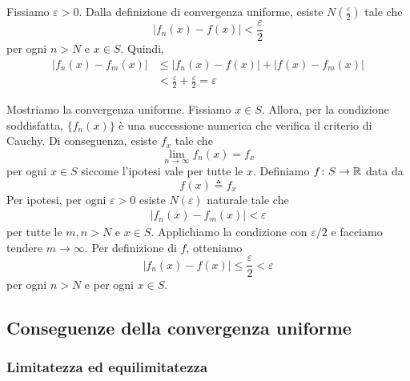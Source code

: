 \documentclass[a4paper]{article}
\begin{document}
\begin{radioactive}
    \begin{snippetproof}{}
        \begin{iffproof}
        \item Fissiamo \(\varepsilon > 0\).
            Dalla definizione di convergenza uniforme,
            esiste \(N\left(\frac{\varepsilon }{2}\right)\) tale che
            \[
                \left|f_n(x) - f(x)\right| < \frac{\varepsilon}{2}
            \]
            per ogni \(n > N\) e \(x \in S\).
            Quindi,
            \begin{align*}
                \left|f_n(x)-f_m(x)\right| &\leq \left|f_n(x)-f(x)\right|+\left|f(x)-f_m(x)\right| \\
                &< \frac{\varepsilon}{2}+\frac{\varepsilon}{2}=\varepsilon
            \end{align*}
        \item Mostriamo la convergenza uniforme. Fissiamo \(x \in S\).
            Allora, per la condizione soddisfatta, \(\{f_n(x)\}\) è una successione
            numerica che verifica il criterio di Cauchy. Di conseguenza, esiste
            \(f_x\) tale che
            \[
                \lim_{n \to \infty} f_n(x) = f_x
            \]
            per ogni \(x \in S\) siccome l'ipotesi vale per tutte le \(x\).
            Definiamo \(f \colon S \to \mathbb{R}\) data da
            \[
                f(x) \triangleq f_x
            \]
            Per ipotesi, per ogni \(\varepsilon > 0\) esiste \(N(\varepsilon)\) naturale tale che
            \begin{align*}
                |f_n(x) - f_m(x)| < \varepsilon
            \end{align*}
            per tutte le \(m,n > N\) e \(x \in S\).
            Applichiamo la condizione con \(\varepsilon/2\) e facciamo tendere \(m\to\infty\). Per definizione di \(f\), otteniamo
            \[
                |f_n(x)-f(x)|\leq \frac{\varepsilon}{2}<\varepsilon
            \]
            per ogni \(n>N\) e per ogni \(x\in S\).
        \end{iffproof}
    \end{snippetproof}
\end{radioactive}

\subsection{Conseguenze della convergenza uniforme}

\subsubsection{Limitatezza ed equilimitatezza}
\end{document}
